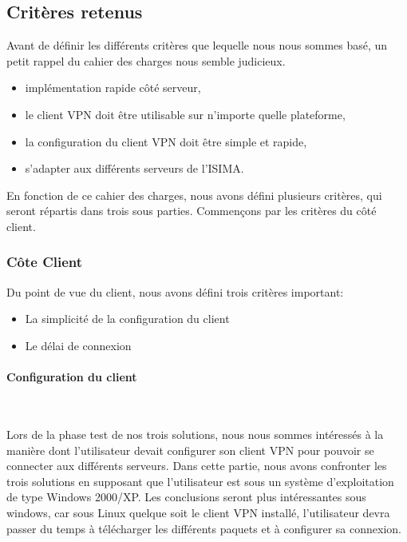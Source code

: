 \subsection{Critères retenus}

Avant de définir les différents critères que lequelle nous nous sommes basé, un petit rappel du cahier des charges nous semble judicieux.


\begin{itemize}
 	\item implémentation rapide côté serveur,
	\item le client VPN doit être utilisable sur n'importe quelle plateforme,
	\item la configuration du client VPN doit être simple et rapide,
	\item s'adapter aux différents serveurs de l'ISIMA.
\end{itemize}


En fonction de ce cahier des charges, nous avons défini plusieurs critères, qui seront répartis dans trois sous parties. Commençons par les critères du côté client. 


\subsubsection{Côte Client}

Du point de vue du client, nous avons défini trois critères important:
\begin{itemize}
 	\item La simplicité de la configuration du client
	\item Le délai de connexion
\end{itemize}

\paragraph{Configuration du client}
~


Lors de la phase test de nos trois solutions, nous nous sommes intéressés à la manière dont l'utilisateur devait configurer son client VPN pour pouvoir se connecter aux différents serveurs. Dans cette partie, nous avons confronter les trois solutions en supposant que l'utilisateur est sous un système d'exploitation de type Windows 2000/XP. Les conclusions seront plus intéressantes sous windows, car sous Linux quelque soit le client VPN installé, l'utilisateur devra passer du temps à télécharger les différents paquets et à configurer sa connexion.

